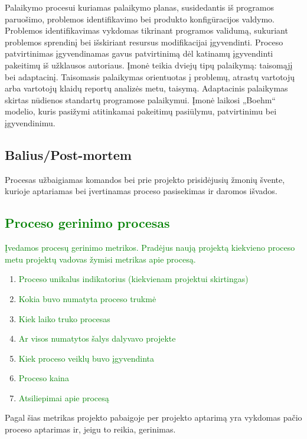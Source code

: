 \documentclass{VUMIFPSkursinis}
\begin{document}
	Palaikymo procesui kuriamas palaikymo planas, susidedantis iš programos paruošimo, problemos identifikavimo bei produkto konfigūracijos valdymo.
	Problemos identifikavimas vykdomas tikrinant programos validumą, sukuriant problemos sprendinį bei išskiriant resursus modifikacijai įgyvendinti.
	Proceso patvirtinimas įgyvendinamas gavus patvirtinimą dėl katinamų įgyvendinti pakeitimų iš užklausos autoriaus.
	Įmonė teikia dviejų tipų palaikymą: taisomąjį bei adaptacinį. Taisomasis palaikymas orientuotas į problemų, atrastų vartotojų arba vartotojų klaidų reportų analizės metu, taisymą.
	Adaptacinis palaikymas skirtas nūdienos standartų programose palaikymui. Įmonė laikosi „Boehm“ modelio, kuris pasižymi atitinkamai pakeitimų pasiūlymu, patvirtinimu bei įgyvendinimu.
	\label{img:boehmsModel}

	\subsection{Balius/Post-mortem}
	Procesas užbaigiamas komandos bei prie projekto prisidėjusių žmonių švente, kurioje aptariamas bei įvertinamas proceso pasisekimas ir daromos išvados.

	\subsection{\textcolor{green}{Proceso gerinimo procesas}}
		\textcolor{green}{Įvedamos procesų gerinimo metrikos.}
		\textcolor{green}{Pradėjus naują projektą kiekvieno proceso metu projektų vadovas žymisi metrikas apie procesą.}
			\begin{enumerate}
				\item{\textcolor{green}{Proceso unikalus indikatorius (kiekvienam projektui skirtingas)}}
				\item{\textcolor{green}{Kokia buvo numatyta proceso trukmė}}
				\item{\textcolor{green}{Kiek laiko truko procesas}}
				\item{\textcolor{green}{Ar visos numatytos šalys dalyvavo projekte}}
				\item{\textcolor{green}{Kiek proceso veiklų buvo įgyvendinta}}
				\item{\textcolor{green}{Proceso kaina}}
				\item{\textcolor{green}{Atsiliepimai apie procesą}}
			\end{enumerate}
		Pagal šias metrikas projekto pabaigoje per projekto aptarimą yra vykdomas pačio proceso aptarimas ir, jeigu to reikia, gerinimas.
\end{document}
